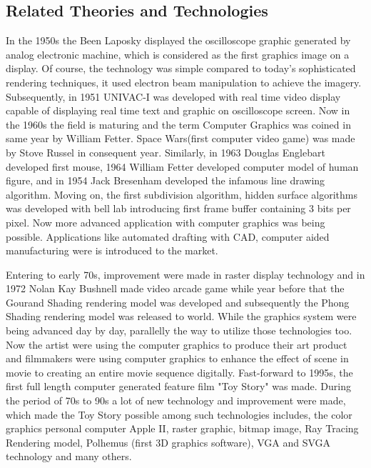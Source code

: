\documentclass{report}
\begin{document}
\subsection{Related Theories and Technologies}
In the 1950s the Been Laposky displayed the oscilloscope graphic generated by analog electronic machine, which is considered as the first
graphics image on a display. Of course, the technology was simple compared to today's sophisticated rendering techniques, it used electron beam
manipulation to achieve the imagery. Subsequently, in 1951 UNIVAC-I was developed with real time video display capable of displaying real time text and graphic on
oscilloscope screen. Now in the 1960s the field is maturing and the term Computer Graphics was coined in same year by William Fetter. Space Wars(first computer video game)
was made by Stove Russel in consequent year. Similarly, in 1963 Douglas Englebart developed first mouse, 1964 William Fetter developed computer model of human figure, and  in 1954 Jack Bresenham
developed the infamous line drawing algorithm. Moving on, the first subdivision algorithm, hidden surface algorithms was developed with bell lab
introducing first frame buffer containing 3 bits per pixel. Now more advanced application with computer graphics was being possible. Applications
like automated drafting with CAD, computer aided manufacturing were is introduced to the market.

Entering to early 70s, improvement were made in raster display technology and in 1972 Nolan Kay Bushnell made video arcade game while year before that the Gourand Shading rendering model was developed and subsequently the
Phong Shading rendering model was released to world. While the graphics system were being advanced day by day, parallelly the way to utilize those technologies too. Now the artist were
using the computer graphics to produce their art product and filmmakers were using computer graphics to enhance the effect of scene in movie to
creating an entire movie sequence digitally. Fast-forward to 1995s, the first full length computer generated feature film "Toy Story" was made.
During the period of 70s to 90s a lot of new technology and improvement were made, which made the Toy Story possible among such technologies includes, the color graphics personal computer
Apple II, raster graphic, bitmap image, Ray Tracing Rendering model, Polhemus (first 3D graphics software), VGA and SVGA technology and many others.
\end{document}
